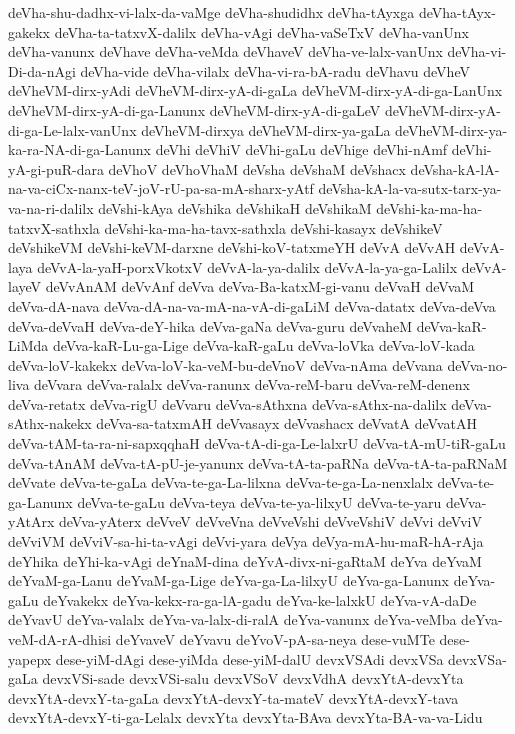 {deVha-shu-dadhx-vi-lalx-da-vaMge
deVha-shudidhx
deVha-tAyxga
deVha-tAyx-gakekx
deVha-ta-tatxvX-dalilx
deVha-vAgi
deVha-vaSeTxV
deVha-vanUnx
deVha-vanunx
deVhave
deVha-veMda
deVhaveV
deVha-ve-lalx-vanUnx
deVha-vi-Di-da-nAgi
deVha-vide
deVha-vilalx
deVha-vi-ra-bA-radu
deVhavu
deVheV
deVheVM-dirx-yAdi
deVheVM-dirx-yA-di-gaLa
deVheVM-dirx-yA-di-ga-LanUnx
deVheVM-dirx-yA-di-ga-Lanunx
deVheVM-dirx-yA-di-gaLeV
deVheVM-dirx-yA-di-ga-Le-lalx-vanUnx
deVheVM-dirxya
deVheVM-dirx-ya-gaLa
deVheVM-dirx-ya-ka-ra-NA-di-ga-Lanunx
deVhi
deVhiV
deVhi-gaLu
deVhige
deVhi-nAmf
deVhi-yA-gi-puR-dara
deVhoV
deVhoVhaM
deVsha
deVshaM
deVshacx
deVsha-kA-lA-na-va-ciCx-nanx-teV-joV-rU-pa-sa-mA-sharx-yAtf
deVsha-kA-la-va-sutx-tarx-ya-va-na-ri-dalilx
deVshi-kAya
deVshika
deVshikaH
deVshikaM
deVshi-ka-ma-ha-tatxvX-sathxla
deVshi-ka-ma-ha-tavx-sathxla
deVshi-kasayx
deVshikeV
deVshikeVM
deVshi-keVM-darxne
deVshi-koV-tatxmeYH
deVvA
deVvAH
deVvA-laya
deVvA-la-yaH-porxVkotxV
deVvA-la-ya-dalilx
deVvA-la-ya-ga-Lalilx
deVvA-layeV
deVvAnAM
deVvAnf
deVva
deVva-Ba-katxM-gi-vanu
deVvaH
deVvaM
deVva-dA-nava
deVva-dA-na-va-mA-na-vA-di-gaLiM
deVva-datatx
deVva-deVva
deVva-deVvaH
deVva-deY-hika
deVva-gaNa
deVva-guru
deVvaheM
deVva-kaR-LiMda
deVva-kaR-Lu-ga-Lige
deVva-kaR-gaLu
deVva-loVka
deVva-loV-kada
deVva-loV-kakekx
deVva-loV-ka-veM-bu-deVnoV
deVva-nAma
deVvana
deVva-no-liva
deVvara
deVva-ralalx
deVva-ranunx
deVva-reM-baru
deVva-reM-denenx
deVva-retatx
deVva-rigU
deVvaru
deVva-sAthxna
deVva-sAthx-na-dalilx
deVva-sAthx-nakekx
deVva-sa-tatxmAH
deVvasayx
deVvashacx
deVvatA
deVvatAH
deVva-tAM-ta-ra-ni-sapxqqhaH
deVva-tA-di-ga-Le-lalxrU
deVva-tA-mU-tiR-gaLu
deVva-tAnAM
deVva-tA-pU-je-yanunx
deVva-tA-ta-paRNa
deVva-tA-ta-paRNaM
deVvate
deVva-te-gaLa
deVva-te-ga-La-lilxna
deVva-te-ga-La-nenxlalx
deVva-te-ga-Lanunx
deVva-te-gaLu
deVva-teya
deVva-te-ya-lilxyU
deVva-te-yaru
deVva-yAtArx
deVva-yAterx
deVveV
deVveVna
deVveVshi
deVveVshiV
deVvi
deVviV
deVviVM
deVviV-sa-hi-ta-vAgi
deVvi-yara
deVya
deVya-mA-hu-maR-hA-rAja
deYhika
deYhi-ka-vAgi
deYnaM-dina
deYvA-divx-ni-gaRtaM
deYva
deYvaM
deYvaM-ga-Lanu
deYvaM-ga-Lige
deYva-ga-La-lilxyU
deYva-ga-Lanunx
deYva-gaLu
deYvakekx
deYva-kekx-ra-ga-lA-gadu
deYva-ke-lalxkU
deYva-vA-daDe
deYvavU
deYva-valalx
deYva-va-lalx-di-ralA
deYva-vanunx
deYva-veMba
deYva-veM-dA-rA-dhisi
deYvaveV
deYvavu
deYvoV-pA-sa-neya
dese-vuMTe
dese-yapepx
dese-yiM-dAgi
dese-yiMda
dese-yiM-dalU
devxVSAdi
devxVSa
devxVSa-gaLa
devxVSi-sade
devxVSi-salu
devxVSoV
devxVdhA
devxYtA-devxYta
devxYtA-devxY-ta-gaLa
devxYtA-devxY-ta-mateV
devxYtA-devxY-tava
devxYtA-devxY-ti-ga-Lelalx
devxYta
devxYta-BAva
devxYta-BA-va-va-Lidu
}
